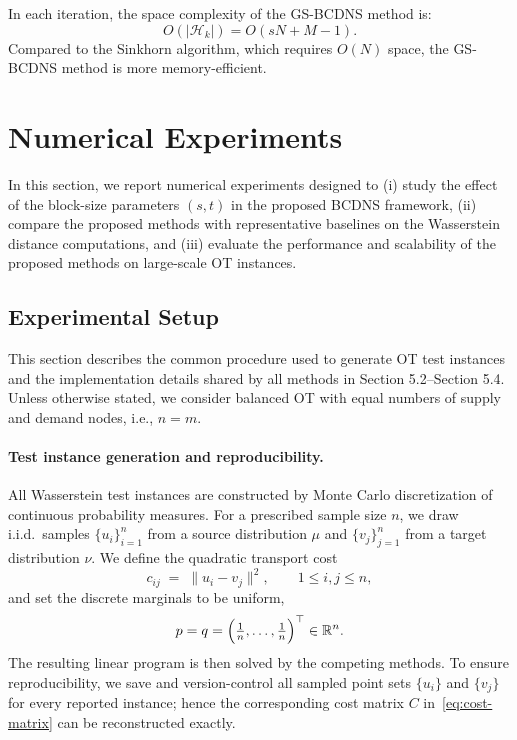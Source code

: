 \documentclass[12pt,a4paper]{article}
\begin{document}
In each iteration, the space complexity of the GS-BCDNS method is:
\[
O(|\mathcal{H}_k|) = O(sN + M - 1).
\]
Compared to the Sinkhorn algorithm, which requires \( O(N) \) space, the GS-BCDNS method is more memory-efficient.





\section{Numerical Experiments}\label{sec:experiments}




In this section, we report numerical experiments designed to (i) study the effect of the block-size parameters $(s,t)$ in the proposed BCDNS framework, (ii) compare the proposed methods with representative baselines on the Wasserstein distance computations, and (iii) evaluate the performance and scalability of the proposed methods on large-scale OT instances.


\subsection{Experimental Setup}\label{subsec:exp-setup}

This section describes the common procedure used to generate OT test instances and the
implementation details shared by all methods in Section 5.2--Section 5.4.
Unless otherwise stated, we consider balanced OT with equal numbers of supply and demand nodes, i.e., $n=m$.


\paragraph{Test instance generation and reproducibility.}
All Wasserstein test instances are constructed by Monte Carlo discretization of continuous
probability measures.
For a prescribed sample size $n$, we draw i.i.d.\ samples
$\{u_i\}_{i=1}^n$ from a source distribution $\mu$ and $\{v_j\}_{j=1}^n$ from a target
distribution $\nu$.
We define the quadratic transport cost
\begin{equation}\label{eq:cost-matrix}
  c_{ij} \;=\; \|u_i - v_j\|^2, \qquad 1\le i,j\le n,
\end{equation}
and set the discrete marginals to be uniform,
\begin{equation}\label{eq:uniform-marginals}
  p=q=\Bigl(\tfrac{1}{n},\dots,\tfrac{1}{n}\Bigr)^\top \in \mathbb{R}^n.
\end{equation}
The resulting linear program is then solved by the competing methods.
To ensure reproducibility, we save and version-control all sampled point sets
$\{u_i\}$ and $\{v_j\}$ for every reported instance; hence the corresponding cost matrix $C$
in~\eqref{eq:cost-matrix} can be reconstructed exactly.
\end{document}
